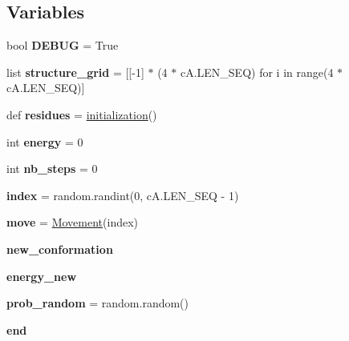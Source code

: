 \subsection*{Variables}
\begin{DoxyCompactItemize}
\item 
\mbox{\label{namespacemain_ad2cce3c3d1036d38f161e4814c97e1b5}} 
bool {\bfseries D\+E\+B\+UG} = True
\item 
\mbox{\label{namespacemain_a67a4a2ee96191c0257e4744c29dacebf}} 
list {\bfseries structure\+\_\+grid} = \mbox{[}\mbox{[}-\/1\mbox{]} $\ast$ (4 $\ast$ c\+A.\+L\+E\+N\+\_\+\+S\+EQ) for i in range(4 $\ast$ c\+A.\+L\+E\+N\+\_\+\+S\+EQ)\mbox{]}
\item 
\mbox{\label{namespacemain_aa03ea582ff8e07a50e1d850a94da8247}} 
def {\bfseries residues} = \hyperlink{namespacemain_a36aaa6fc324305b9b0013cabac87a440}{initialization}()
\item 
\mbox{\label{namespacemain_acf3ae58f7e5852d1a97cf6724b61b22f}} 
int {\bfseries energy} = 0
\item 
\mbox{\label{namespacemain_a7610361849a3e9841a1fda5a35cbf08c}} 
int {\bfseries nb\+\_\+steps} = 0
\item 
\mbox{\label{namespacemain_ad27810fad03b934ace3a471c21bbf5f6}} 
{\bfseries index} = random.\+randint(0, c\+A.\+L\+E\+N\+\_\+\+S\+EQ -\/ 1)
\item 
\mbox{\label{namespacemain_abd2ad656597053996e03e3e64fcfa224}} 
{\bfseries move} = \hyperlink{classMovement_1_1Movement}{Movement}(index)
\item 
{\bfseries new\+\_\+conformation}
\item 
{\bfseries energy\+\_\+new}
\item 
\mbox{\label{namespacemain_a3347eebfe7bf1b0e0047d6b3ec5f3337}} 
{\bfseries prob\+\_\+random} = random.\+random()
\item 
\mbox{\label{namespacemain_ada24c0f5d143f130aceaf05ae35895fd}} 
{\bfseries end}
\end{DoxyCompactItemize}


